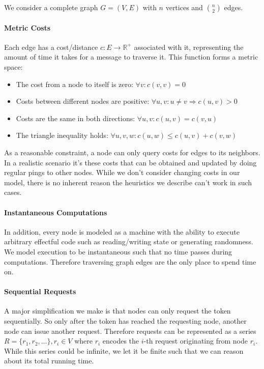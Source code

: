 \documentclass[a4paper, oneside]{discothesis}
\begin{document}
We consider a complete graph $G=(V,E)$ with $n$ vertices and $\binom{n}{2}$ edges.

\paragraph{Metric Costs} Each edge has a cost/distance $c : E \rightarrow \mathbb{R}^+$ associated with it, representing the amount of time it takes for a message to traverse it. This function forms a metric space:
\begin{itemize}
\item The cost from a node to itself is zero: $\forall v:c(v, v)=0$
\item Costs between different nodes are positive: $\forall u,v : u\neq v\Rightarrow c(u,v)>0$
\item Costs are the same in both directions: $\forall u,v : c(u,v)=c(v,u)$
\item The triangle inequality holds: $\forall u,v,w : c(u,w)\leq c(u,v)+c(v,w)$
\end{itemize}

As a reasonable constraint, a node can only query costs for edges to its neighbors. In a realistic scenario it's these costs that can be obtained and updated by doing regular pings to other nodes. While we don't consider changing costs in our model, there is no inherent reason the heuristics we describe can't work in such cases.

\paragraph{Instantaneous Computations} In addition, every node is modeled as a machine with the ability to execute arbitrary effectful code such as reading/writing state or generating randomness. We model execution to be instantaneous such that no time passes during computations. Therefore traversing graph edges are the only place to spend time on.

\paragraph{Sequential Requests} A major simplification we make is that nodes can only request the token sequentially. So only after the token has reached the requesting node, another node can issue another request. Therefore requests can be represented as a series $R=\{r_1,r_2,\dots\},r_i\in V$ where $r_i$ encodes the $i$-th request originating from node $r_i$. While this series could be infinite, we let it be finite such that we can reason about its total running time.
\end{document}
